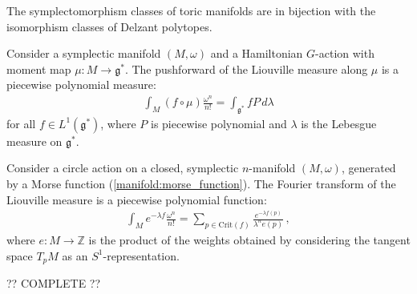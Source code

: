    \begin{theorem}[Delzant]
        The symplectomorphism classes of toric manifolds are in bijection with the isomorphism classes of Delzant polytopes.
    \end{theorem}

    \begin{theorem}
        Consider a symplectic manifold $(M,\omega)$ and a Hamiltonian $G$-action with moment map $\mu:M\rightarrow\mathfrak{g}^*$. The pushforward of the Liouville measure along $\mu$ is a piecewise polynomial measure:
        \begin{gather}
            \int_M (f\circ\mu)\frac{\omega^n}{n!} = \int_{\mathfrak{g}^*}fP\,d\lambda
        \end{gather}
        for all $f\in L^1(\mathfrak{g}^*)$, where $P$ is piecewise polynomial and $\lambda$ is the Lebesgue measure on $\mathfrak{g}^*$.
    \end{theorem}
    \begin{result}[Localization]
        Consider a circle action on a closed, symplectic $n$-manifold $(M,\omega)$, generated by a Morse function (\cref{manifold:morse_function}). The Fourier transform of the Liouville measure is a piecewise polynomial function:
        \begin{gather}
            \int_Me^{-\lambda f}\frac{\omega^n}{n!} = \sum_{p\in\mathrm{Crit}(f)}\frac{e^{-\lambda f(p)}}{\lambda^n e(p)}\,,
        \end{gather}
        where $e:M\rightarrow\mathbb{Z}$ is the product of the weights obtained by considering the tangent space $T_pM$ as an $S^1$-representation.
    \end{result}

    ?? COMPLETE ??


